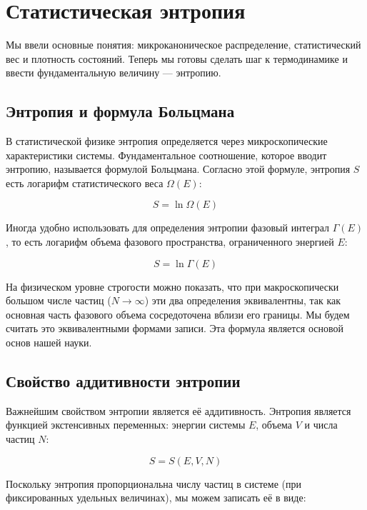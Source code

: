 \documentclass[../general/general]{subfiles}
\begin{document}
\section{Статистическая энтропия}

Мы ввели основные понятия: микроканоническое распределение, статистический вес и плотность состояний. Теперь мы готовы сделать шаг к термодинамике и ввести фундаментальную величину — энтропию.

\subsection{Энтропия и формула Больцмана}

В статистической физике энтропия определяется через микроскопические характеристики системы. Фундаментальное соотношение, которое вводит энтропию, называется формулой Больцмана. Согласно этой формуле, энтропия $S$ есть логарифм статистического веса $\Omega(E)$:

\begin{equation}
    S = \ln \Omega(E)
\end{equation}

Иногда удобно использовать для определения энтропии фазовый интеграл $\Gamma(E)$, то есть логарифм объема фазового пространства, ограниченного энергией $E$:

\begin{equation}
    S = \ln \Gamma(E)
\end{equation}

На физическом уровне строгости можно показать, что при макроскопически большом числе частиц ($N \to \infty$) эти два определения эквивалентны, так как основная часть фазового объема сосредоточена вблизи его границы. Мы будем считать это эквивалентными формами записи. Эта формула является основой основ нашей науки.

\subsection{Свойство аддитивности энтропии}

Важнейшим свойством энтропии является её аддитивность. Энтропия является функцией экстенсивных переменных: энергии системы $E$, объема $V$ и числа частиц $N$:

\begin{equation}
    S = S(E, V, N)
\end{equation}

Поскольку энтропия пропорциональна числу частиц в системе (при фиксированных удельных величинах), мы можем записать её в виде:
\end{document}
